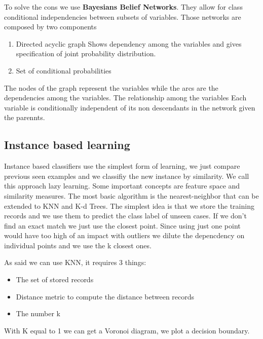 To solve the cons we use \textbf{Bayesians Belief Networks}. They allow for class conditional independencies between subsets of variables.
Those networks are composed by two components
\begin{enumerate}
    \item Directed acyclic graph \ra Shows dependency among the variables and gives specification of joint probability distribution.
    \item Set of conditional probabilities
\end{enumerate}

The nodes of the graph represent the variables while the arcs are the dependencies among the variables.
The relationship among the variables \ra Each variable is conditionally independent of its non descendants in the network given the parennts.



\subsection{Instance based learning}

Instance based classifiers use the simplest form of learning, we just compare previous
seen examples and we classifiy the new instance by similarity. We call this approach lazy learning. Some important concepts are
feature space and similarity measures. The most basic algorithm is the nearest-neighbor that can be extended to KNN and K-d Trees.
The simplest idea is that we store the training records and we use them to predict the class label of unseen cases.
If we don't find an exact match we just use the closest point. Since using just one point would have too high of an impact with outliers we 
dilute the depencdency on individual points and we use the k closest ones. 

\vspace{10pt}

As said we can use KNN, it requires 3 things:
\begin{itemize}
    \item The set of stored records
    \item Distance metric to compute the distance between records
    \item The number k
\end{itemize}

With K equal to 1 we can get a Voronoi diagram, we plot a decision boundary. 

\vspace{10pt}

